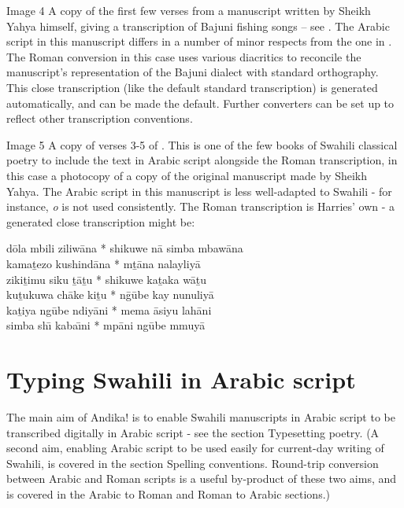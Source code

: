 \documentclass[a4paper,10pt, oneside]{book}
\newcommand\Tr[1]{{\fontspec[Scale=0.9, Color=666666]{Linux Biolinum O}#1}}   %
\begin{document}
Image 4
A copy of the first few verses from a manuscript written by Sheikh Yahya himself, giving a transcription of Bajuni fishing songs -- see \citet{Donnelly1982}.  The Arabic script in this manuscript differs in a number of minor respects from the one in \citet{Omar1997}.  The Roman conversion in this case uses various diacritics to reconcile the manuscript's representation of the Bajuni dialect with standard orthography. This close transcription (like the default standard transcription) is generated automatically, and can be made the default. Further converters can be set up to reflect other transcription conventions.

Image 5
A copy of verses 3-5 of \citet{Harries1967}.  This is one of the few books of Swahili classical poetry to include the text in Arabic script alongside the Roman transcription, in this case a photocopy of a copy of the original manuscript made by Sheikh Yahya. The Arabic script in this manuscript is less well-adapted to Swahili - for instance, \textit{o} is not used consistently. The Roman transcription is Harries' own - a generated close transcription might be:

\hangindent=3cm  %
\Tr{
dōla mbili ziliwāna * shikuwe nā simba mbawāna\\
kamaṯezo kushindāna * mṯāna nalayliyā\\
zikiṯimu siku ṯāṯu * shikuwe kaṯaka wāṯu\\
kuṯukuwa chāke kiṯu * nḡūbe kay nunuliyā\\
kaṯiya ngūbe ndiyāni * mema āsiyu lahāni\\
simba shı̄ kabaı̄ni * mpāni ngūbe mmuyā
}\normalfont


\chapter{Typing Swahili in Arabic script}

The main aim of Andika! is to enable Swahili manuscripts in Arabic script to be transcribed digitally in Arabic script - see the section Typesetting poetry. (A second aim, enabling Arabic script to be used easily for current-day writing of Swahili, is covered in the section Spelling conventions. Round-trip conversion between Arabic and Roman scripts is a useful by-product of these two aims, and is covered in the Arabic to Roman and Roman to Arabic sections.)
\end{document}
